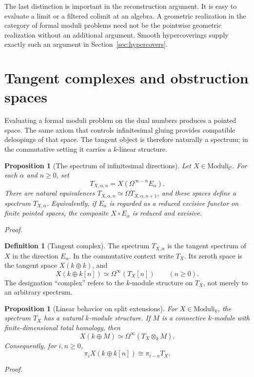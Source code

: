 \documentclass[12pt,letterpaper,oneside]{report}
\newtheorem{proposition}[theorem]{Proposition}
\theoremstyle{definition}
\newtheorem{definition}[theorem]{Definition}
\theoremstyle{remark}
\renewenvironment{proof}[1][Proof]{\par\nopagebreak[4]\addvspace{4pt}\noindent\textit{#1.}\par\nobreak\vspace{0.5\baselineskip}}{\par\addvspace{4pt}}
\newcommand{\cC}{\mathcal C}
\newcommand{\FMP}{\mathrm{Moduli}}
\begin{document}
The last distinction is important in the reconstruction argument. It is easy to evaluate a limit or a filtered colimit at an algebra. A geometric realization in the category of formal moduli problems need not be the pointwise geometric realization without an additional argument. Smooth hypercoverings supply exactly such an argument in Section~\ref{sec:hypercovers}.

\section{Tangent complexes and obstruction spaces}
\label{sec:tangent}

Evaluating a formal moduli problem on the dual numbers produces a pointed space. The same axiom that controls infinitesimal gluing provides compatible deloopings of that space. The tangent object is therefore naturally a spectrum; in the commutative setting it carries a $k$-linear structure.

\begin{proposition}[The spectrum of infinitesimal directions]
\label{prop:tangent-spectrum}
Let $X\in\FMP_{\cC}$. For each $\alpha$ and $n\geq0$, set
\[
 T_{X,\alpha,n}=X(\Omega^{\infty-n}E_\alpha).
\]
There are natural equivalences $T_{X,\alpha,n}\simeq\Omega T_{X,\alpha,n+1}$, and these spaces define a spectrum $T_{X,\alpha}$. Equivalently, if $E_\alpha$ is regarded as a reduced excisive functor on finite pointed spaces, the composite $X\circ E_\alpha$ is reduced and excisive.
\end{proposition}
\begin{proof}
\end{proof}


\begin{definition}[Tangent complex]
The spectrum $T_{X,\alpha}$ is the tangent spectrum of $X$ in the direction $E_\alpha$. In the commutative context write $T_X$. Its zeroth space is the tangent space $X(k\oplus k)$, and
\[
 X(k\oplus k[n])\simeq\Omega^\infty(T_X[n])\qquad(n\geq0).
\]
The designation ``complex'' refers to the $k$-module structure on $T_X$, not merely to an arbitrary spectrum.
\end{definition}

\begin{proposition}[Linear behavior on split extensions]
\label{prop:linear}
For $X\in\FMP_k$, the spectrum $T_X$ has a natural $k$-module structure. If $M$ is a connective $k$-module with finite-dimensional total homology, then
\[
 X(k\oplus M)\simeq\Omega^\infty(T_X\otimes_k M).
\]
Consequently, for $i,n\geq0$,
\[
 \pi_i X(k\oplus k[n])\cong\pi_{i-n}T_X.
\]
\end{proposition}
\begin{proof}
\end{proof}
\end{document}
